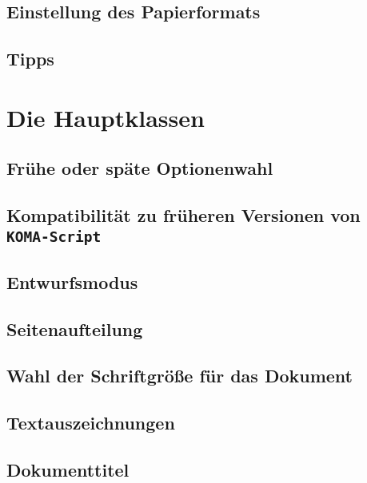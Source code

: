 \section{Einstellung des Papierformats}
\label{sec:Einfuehrung:Satzspiegelberechnung:Einstellung Papierformat}
\lipsum[1-1]
\section{Tipps}
\label{sec:Einfuehrung:Satzspiegelberechnung:Tipps}
\lipsum[1-1]

\chapter{Die Hauptklassen \texorpdfstring{}{scrbook, scrreprt, scrartcl}}
\label{chap:Einfuehrung:Hauptklassen}
\section{Frühe oder späte Optionenwahl}
\label{sec:Einfuehrung:Hauptklassen:Optionenwahl}
\lipsum[1-1]
\section{Kompatibilität zu früheren Versionen von \texttt{KOMA-Script}}
\label{sec:Einfuehrung:Hauptklassen:Kompatibilitaet}
\lipsum[1-1]
\section{Entwurfsmodus}
\label{sec:Einfuehrung:Hauptklassen:Entwurfsmodus}
\lipsum[1-1]
\section{Seitenaufteilung}
\label{sec:Einfuehrung:Hauptklassen:Seitenaufteilung}
\lipsum[1-1]
\section{Wahl der Schriftgröße für das Dokument}
\label{sec:Einfuehrung:Hauptklassen:Wahl Schriftgroesse}
\lipsum[1-1]
\section{Textauszeichnungen}
\label{sec:Einfuehrung:Hauptklassen:Textauszeichnungen}
\lipsum[1-1]
\section{Dokumenttitel}
\label{sec:Einfuehrung:Hauptklassen:Dokumenttitel}
\lipsum[1-1]
